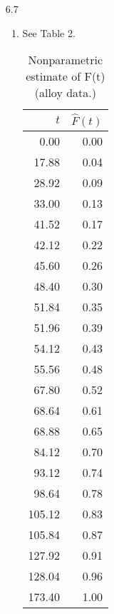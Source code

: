 \documentclass[12pt]{article}\usepackage[]{graphicx}\usepackage[]{color}
\begin{document}
\begin{enumerate}
  \item[6.7]
  \begin{enumerate}
    \item See Table 2.
\begin{table}[ht]
\centering
\begin{tabular}{rr}
  \hline
$t$ & $\widehat{F}(t)$ \\ 
  \hline
0.00 & 0.00 \\ 
  17.88 & 0.04 \\ 
  28.92 & 0.09 \\ 
  33.00 & 0.13 \\ 
  41.52 & 0.17 \\ 
  42.12 & 0.22 \\ 
  45.60 & 0.26 \\ 
  48.40 & 0.30 \\ 
  51.84 & 0.35 \\ 
  51.96 & 0.39 \\ 
  54.12 & 0.43 \\ 
  55.56 & 0.48 \\ 
  67.80 & 0.52 \\ 
  68.64 & 0.61 \\ 
  68.88 & 0.65 \\ 
  84.12 & 0.70 \\ 
  93.12 & 0.74 \\ 
  98.64 & 0.78 \\ 
  105.12 & 0.83 \\ 
  105.84 & 0.87 \\ 
  127.92 & 0.91 \\ 
  128.04 & 0.96 \\ 
  173.40 & 1.00 \\ 
   \hline
\end{tabular}
\caption{Nonparametric estimate of F(t) (alloy data.)} 
\end{table}


\end{enumerate}
\end{enumerate}
\end{document}
